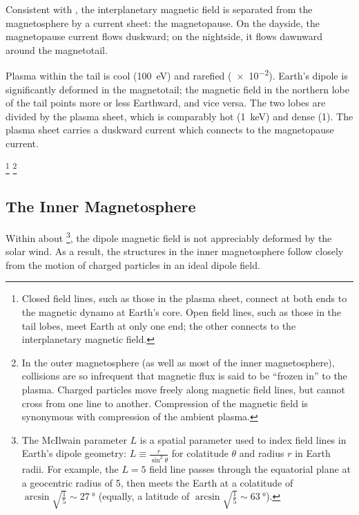 Consistent with \amplaw, the interplanetary magnetic field is separated from the magnetosphere by a current sheet: the magnetopause. On the dayside, the magnetopause current flows duskward; on the nightside, it flows dawnward around the magnetotail. 

Plasma within the tail is cool (\about\SI{100}{\eV}) and rarefied (\about\SI{e-2}{\percc}). Earth's dipole is significantly deformed in the magnetotail; the magnetic field in the northern lobe of the tail points more or less Earthward, and vice versa. The two lobes are divided by the plasma sheet, which is comparably hot (\about\SI{1}{\keV}) and dense (\about\SI{1}{\percc}). The plasma sheet carries a duskward current which connects to the magnetopause current. 

\footnote{Closed field lines, such as those in the plasma sheet, connect at both ends to the magnetic dynamo at Earth's core. Open field lines, such as those in the tail lobes, meet Earth at only one end; the other connects to the interplanetary magnetic field. }
\footnote{In the outer magnetosphere (as well as most of the inner magnetosphere), collisions are so infrequent that magnetic flux is said to be ``frozen in'' to the plasma. Charged particles move freely along magnetic field lines, but cannot cross from one line to another. Compression of the magnetic field is synonymous with compression of the ambient plasma. }

\subsection{The Inner Magnetosphere}

Within about \footnote{The McIlwain parameter $L$ is a spatial parameter used to index field lines in Earth's dipole geometry: $L \equiv \frac{r}{\sin^2\theta}$ for colatitude $\theta$ and radius $r$ in Earth radii. For example, the $L=5$ field line passes through the equatorial plane at a geocentric radius of \SI{5}{\RE}, then meets the Earth at a colatitude of $\arcsin \sqrt{ \frac{1}{5} } \sim \SI{27}{\degree}$ (equally, a latitude of $\arcsin \sqrt{ \frac{1}{5} } \sim \SI{63}{\degree}$). }, the dipole magnetic field is not appreciably deformed by the solar wind. As a result, the structures in the inner magnetosphere follow closely from the motion of charged particles in an ideal dipole field. 

